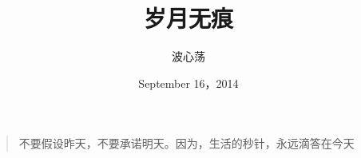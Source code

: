 \documentclass[11pt, a4paper]{book}
\begin{document}
\frontmatter
\renewcommand\contentsname{目录}
\title{岁月无痕}
\author{波心荡}
\date{September 16，2014}

\clearpage\maketitle
\thispagestyle{empty}

\vspace*{\fill} 
\begin{quote} 
\centering 
不要假设昨天，不要承诺明天。因为，生活的秒针，永远滴答在今天
\end{quote}
\vspace*{\fill}
\newpage


\onehalfspacing
\addtolength{\parskip}{3pt}
\setlength{\parindent}{2em}

\singlespacing
\setlength{\parskip}{0pt}
\tableofcontents

\onehalfspacing
\addtolength{\parskip}{3pt}
\setlength{\parindent}{2em}



\singlespacing
\setlength{\parskip}{0pt}
\mainmatter
\onehalfspacing




\end{document}
